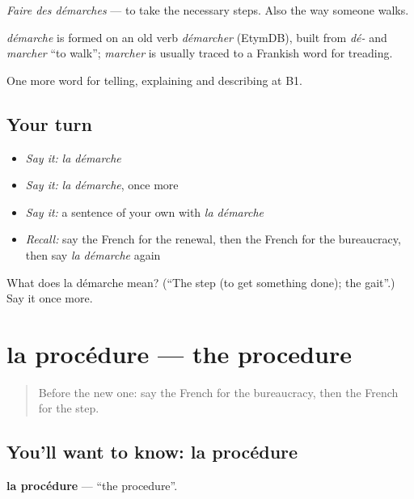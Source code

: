 \emph{Faire des démarches} — to take the necessary steps. Also the way someone walks.

\begin{cousinweb}
\emph{démarche} is formed on an old verb \emph{démarcher} (EtymDB), built from \emph{dé-} and \emph{marcher} \textquotedblleft{}to walk\textquotedblright{}; \emph{marcher} is usually traced to a Frankish word for treading.
\end{cousinweb}

\begin{grammarlens}[title={What you've built}]
One more word for telling, explaining and describing at B1.
\end{grammarlens}

\subsection*{Your turn}
\begin{itemize}
\raggedright
  \item \emph{Say it:} \emph{la démarche}
  \item \emph{Say it:} \emph{la démarche}, once more
  \item \emph{Say it:} a sentence of your own with \emph{la démarche}
  \item \emph{Recall:} say the French for the renewal, then the French for the bureaucracy, then say \emph{la démarche} again
\end{itemize}

\begin{tcolorbox}[breakable,colback=teal!4,colframe=teal!35!black,title={Before you move on}]
What does la démarche mean? (\textquotedblleft{}The step (to get something done); the gait\textquotedblright{}.) Say it once more.
\end{tcolorbox}
\section[la procédure]{la procédure — the procedure}

\label{lesson:FR-C385-procedure}



\begin{quote}
Before the new one: say the French for the bureaucracy, then the French for the step.
\end{quote}

\subsection*{You'll want to know: la procédure}
\textbf{la procédure} — \textquotedblleft{}the procedure\textquotedblright{}.

